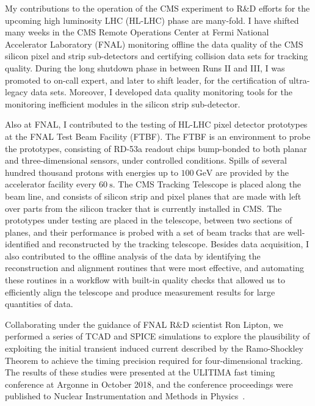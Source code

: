 My contributions to the operation of the CMS experiment to R\&D efforts for the upcoming high luminosity LHC (HL-LHC) phase are many-fold.
I have shifted many weeks in the CMS Remote Operations Center at Fermi National Accelerator Laboratory (FNAL) monitoring offline the data quality of the CMS silicon pixel and strip sub-detectors and certifying collision data sets for tracking quality.
During the long shutdown phase in between Runs II and III, I was promoted to on-call expert, and later to shift leader, for the certification of ultra-legacy data sets.
Moreover, I developed data quality monitoring tools for the monitoring inefficient modules in the silicon strip sub-detector.

Also at FNAL, I contributed to the testing of HL-LHC pixel detector prototypes at the FNAL Test Beam Facility (FTBF).
The FTBF is an environment to probe the prototypes, consisting of RD-53a readout chips bump-bonded to both planar and three-dimensional sensors, under controlled conditions.
Spills of several hundred thousand protons with energies up to $\SI{100}{\GeV}$ are provided by the accelerator facility every $\SI{60}{\s}$.
The CMS Tracking Telescope is placed along the beam line, and consists of silicon strip and pixel planes that are made with left over parts from the silicon tracker that is currently installed in CMS.
The prototypes under testing are placed in the telescope, between two sections of planes, and their performance is probed with a set of beam tracks that are well-identified and reconstructed by the tracking telescope.
Besides data acquisition, I also contributed to the offline analysis of the data by identifying the reconstruction and alignment routines that were most effective, and automating these routines in a workflow with built-in quality checks that allowed us to efficiently align the telescope and produce measurement results for large quantities of data.

Collaborating under the guidance of FNAL R\&D scientist Ron Lipton, we performed a series of TCAD and SPICE simulations to explore the plausibility of exploiting the initial transient induced current
described by the Ramo-Shockley Theorem to achieve the timing precision required for four-dimensional tracking.
The results of these studies were presented at the ULITIMA fast timing conference at Argonne in October 2018, and the conference proceedings were published to Nuclear Instrumentation and Methods in Physics~\cite{LIPTON2019162423}.

